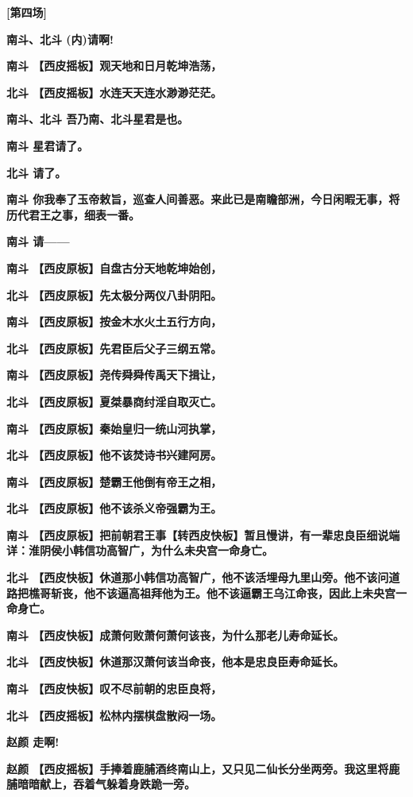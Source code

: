 \textbf{{[}第四场{]}}

\textbf{南斗、北斗 (内)请啊!}

\textbf{南斗 【西皮摇板】观天地和日月乾坤浩荡，}

\textbf{北斗 【西皮摇板】水连天天连水渺渺茫茫。}

\textbf{南斗、北斗 吾乃南、北斗星君是也。}

\textbf{南斗 星君请了。}

\textbf{北斗 请了。}

\textbf{南斗
你我奉了玉帝敕旨，巡查人间善恶。来此已是南瞻部洲，今日闲暇无事，将历代君王之事，细表一番。}

\textbf{南斗 请------}

\textbf{南斗 【西皮原板】自盘古分天地乾坤始创，}

\textbf{北斗 【西皮原板】先太极分两仪八卦阴阳。}

\textbf{南斗 【西皮原板】按金木水火土五行方向，}

\textbf{北斗 【西皮原板】先君臣后父子三纲五常。}

\textbf{南斗 【西皮原板】尧传舜舜传禹天下揖让，}

\textbf{北斗 【西皮原板】夏桀暴商纣淫自取灭亡。}

\textbf{南斗 【西皮原板】秦始皇归一统山河执掌，}

\textbf{北斗 【西皮原板】他不该焚诗书兴建阿房。}

\textbf{南斗 【西皮原板】楚霸王他倒有帝王之相，}

\textbf{北斗 【西皮原板】他不该杀义帝强霸为王。}

\textbf{南斗
【西皮原板】把前朝君王事【转西皮快板】暂且慢讲，有一辈忠良臣细说端详：淮阴侯小韩信功高智广，为什么未央宫一命身亡。}

\textbf{北斗
【西皮快板】休道那小韩信功高智广，他不该活埋母九里山旁。他不该问道路把樵哥斩丧，他不该逼高祖拜他为王。他不该逼霸王乌江命丧，因此上未央宫一命身亡。}

\textbf{南斗 【西皮快板】成萧何败萧何萧何该丧，为什么那老儿寿命延长。}

\textbf{北斗 【西皮快板】休道那汉萧何该当命丧，他本是忠良臣寿命延长。}

\textbf{南斗 【西皮快板】叹不尽前朝的忠臣良将，}

\textbf{北斗 【西皮摇板】松林内摆棋盘散闷一场。}

\textbf{赵颜 走啊!}

\textbf{赵颜
【西皮摇板】手捧着鹿脯酒终南山上，又只见二仙长分坐两旁。我这里将鹿脯暗暗献上，吞着气躲着身跌跪一旁。}

